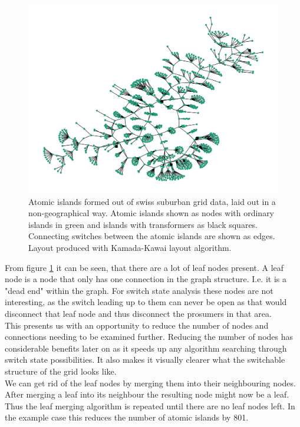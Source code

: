 \begin{figure}[H]
    \begin{center}
        \includegraphics[width=.7\linewidth]{img/switchstate_exploring/swiss_suburb/topology_with_leafs.png}
    \end{center}
    \caption{
        Atomic islands formed out of swiss suburban grid data, laid out in a non-geographical way.
        Atomic islands shown as nodes with 
        ordinary islands in green and islands with transformers as black squares. Connecting switches between the
        atomic islands are shown as edges. Layout produced with
        Kamada-Kawai layout algorithm\autocite{kamada_kawai}.
    }
    \label{fig:data_prep:swiss_suburb_with_leafs}
\end{figure}

From figure \ref{fig:data_prep:swiss_suburb_with_leafs} it can be seen, that
there are a lot of leaf nodes present. A leaf node is a node that only has
one connection in the graph structure. I.e. it is a "dead end" within the graph.
For switch state analysis these nodes are not interesting, as the switch leading
up to them can never be open as that would disconnect that leaf node and thus
disconnect the prosumers in that area.\\
This presents us with an opportunity to
reduce the number of nodes and connections needing to be examined further. Reducing the number of
nodes has considerable benefits later on as it speeds up any algorithm
searching through switch state possibilities. It also makes it visually clearer
what the switchable structure of the grid looks like. \\
We can get rid of the leaf nodes by merging them into their neighbouring nodes. 
After merging a leaf into its neighbour the resulting node might now be a leaf. Thus 
the leaf merging algorithm is repeated until there are no leaf nodes left. In the example
case this reduces the number of atomic islands by 801.

